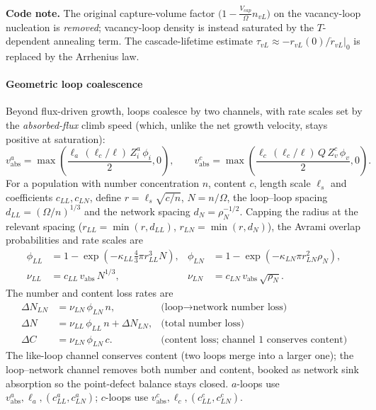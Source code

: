 \documentclass{article}
\begin{document}
\par\medskip\noindent%
\textbf{Code note.} The original capture-volume factor
$\bigl(1-\tfrac{V_{cap}}{\Omega}n_{vL}\bigr)$ on the vacancy-loop nucleation is
\emph{removed}; vacancy-loop density is instead saturated by the $T$-dependent
annealing term. The cascade-lifetime estimate
$\tau_{vL}\approx-r_{vL}(0)/\dot r_{vL}|_0$ is replaced by the Arrhenius law.\par\medskip

\paragraph{Geometric loop coalescence}\label{sec:coal}
Beyond flux-driven growth, loops coalesce by two channels, with rate scales set
by the \emph{absorbed-flux} climb speed (which, unlike the net growth velocity,
stays positive at saturation):
\begin{equation}
v_{\mathrm{abs}}^{a}=\max\!\left(\frac{\ell_a\,(\ell_c/\ell)\,Z_i^{a}\,\phi_i}{2},0\right),
\qquad
v_{\mathrm{abs}}^{c}=\max\!\left(\frac{\ell_c\,(\ell_c/\ell)\,Q\,Z_v^{c}\,\phi_v}{2},0\right).
\end{equation}
For a population with number concentration $n$, content
$c$, length scale $\ell_s$ and coefficients $c_{LL},c_{LN}$,
define $r=\ell_s\sqrt{c/n}$,
$N=n/\Omega$, the loop--loop spacing $d_{LL}=(\Omega/n)^{1/3}$
and the network spacing $d_N=\rho_N^{-1/2}$. Capping the radius at the relevant
spacing ($r_{LL}=\min(r,d_{LL})$, $r_{LN}=\min(r,d_N)$), the Avrami overlap
probabilities and rate scales are
\begin{align}
\phi_{LL}&=1-\exp\!\left(-\kappa_{LL}\tfrac{4}{3}\pi r_{LL}^3 N\right), &
\phi_{LN}&=1-\exp\!\left(-\kappa_{LN}\pi r_{LN}^2 \rho_N\right),\\
\nu_{LL}&=c_{LL}\,v_{\mathrm{abs}}\,N^{1/3}, &
\nu_{LN}&=c_{LN}\,v_{\mathrm{abs}}\,\sqrt{\rho_N}.
\end{align}
The number and content loss rates are
\begin{align}
\Delta N_{LN}&=\nu_{LN}\,\phi_{LN}\,n, &
\text{(loop$\to$network number loss)}\\
\Delta N&=\nu_{LL}\,\phi_{LL}\,n+\Delta N_{LN}, &
\text{(total number loss)}\\
\Delta C&=\nu_{LN}\,\phi_{LN}\,c. &
\text{(content loss; channel 1 conserves content)}
\end{align}
The like-loop channel conserves content (two loops merge into a larger one); the
loop--network channel removes both number and content, booked as network sink
absorption so the point-defect balance stays closed. $a$-loops use
$v_{\mathrm{abs}}^{a},\ell_a,(c_{LL}^a,c_{LN}^a)$; $c$-loops use
$v_{\mathrm{abs}}^{c},\ell_c,(c_{LL}^c,c_{LN}^c)$.
\end{document}
